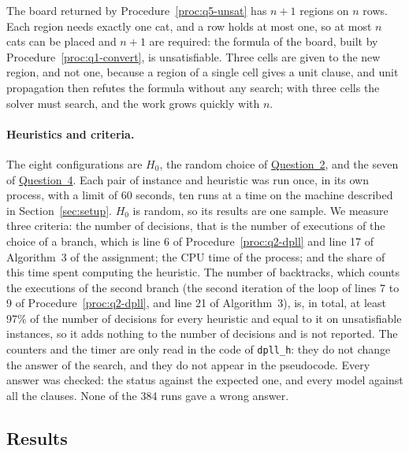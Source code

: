 The board returned by Procedure~\ref{proc:q5-unsat} has $n+1$ regions on $n$ rows. Each region needs exactly one cat, and a row holds at most one, so at most $n$ cats can be placed and $n+1$ are required: the formula of the board, built by Procedure~\ref{proc:q1-convert}, is unsatisfiable. Three cells are given to the new region, and not one, because a region of a single cell gives a unit clause, and unit propagation then refutes the formula without any search; with three cells the solver must search, and the work grows quickly with $n$.

\paragraph{Heuristics and criteria.} The eight configurations are $H_0$, the random choice of \hyperref[sec:q2]{Question~2}, and the seven of \hyperref[sec:q4]{Question~4}. Each pair of instance and heuristic was run once, in its own process, with a limit of 60 seconds, ten runs at a time on the machine described in Section~\ref{sec:setup}. $H_0$ is random, so its results are one sample. We measure three criteria: the number of decisions, that is the number of executions of the choice of a branch, which is line 6 of Procedure~\ref{proc:q2-dpll} and line 17 of Algorithm~3 of the assignment; the CPU time of the process; and the share of this time spent computing the heuristic. The number of backtracks, which counts the executions of the second branch (the second iteration of the loop of lines 7 to 9 of Procedure~\ref{proc:q2-dpll}, and line 21 of Algorithm~3), is, in total, at least 97\% of the number of decisions for every heuristic and equal to it on unsatisfiable instances, so it adds nothing to the number of decisions and is not reported. The counters and the timer are only read in the code of \texttt{dpll\_h}: they do not change the answer of the search, and they do not appear in the pseudocode. Every answer was checked: the status against the expected one, and every model against all the clauses. None of the 384 runs gave a wrong answer.

\subsection{Results}

